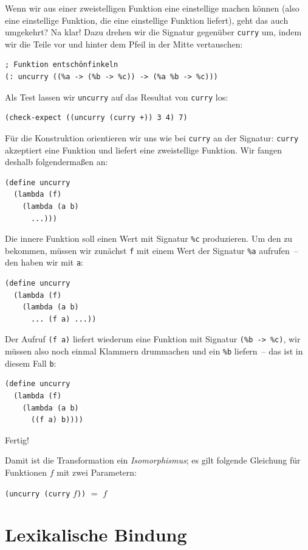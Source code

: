 Wenn wir aus einer zweistelligen Funktion eine einstellige machen
können (also eine einstellige Funktion, die eine einstellige Funktion
liefert), geht das auch umgekehrt?  Na klar!  Dazu drehen wir die
Signatur gegenüber \lstinline{curry} um, indem wir die Teile vor und
hinter dem Pfeil in der Mitte vertauschen:
%
\begin{lstlisting}
; Funktion entschönfinkeln
(: uncurry ((%a -> (%b -> %c)) -> (%a %b -> %c)))
\end{lstlisting}
%
Als Test lassen wir \lstinline{uncurry} auf das Resultat von
\lstinline{curry} los:
\begin{lstlisting}
(check-expect ((uncurry (curry +)) 3 4) 7)
\end{lstlisting}
%
Für die Konstruktion orientieren wir uns wie bei \lstinline{curry} an
der Signatur: \lstinline{curry} akzeptiert eine Funktion und liefert
eine zweistellige Funktion.  Wir fangen deshalb folgendermaßen an:
%
\begin{lstlisting}
(define uncurry
  (lambda (f)
    (lambda (a b)
      ...)))
\end{lstlisting}
%
Die innere Funktion soll einen Wert mit Signatur \lstinline{%c}
produzieren.  Um den zu bekommen, müssen wir zunächst \lstinline{f}
mit einem Wert der Signatur \lstinline{%a} aufrufen~-- den haben wir
mit \lstinline{a}:
%
\begin{lstlisting}
(define uncurry
  (lambda (f)
    (lambda (a b)
      ... (f a) ...))
\end{lstlisting}
%
Der Aufruf \lstinline{(f a)} liefert wiederum eine Funktion mit
Signatur \lstinline{(%b -> %c)}, wir müssen also noch einmal Klammern
drummachen und ein \lstinline{%b} liefern~-- das ist in diesem Fall
\lstinline{b}:
%
\begin{lstlisting}
(define uncurry
  (lambda (f)
    (lambda (a b)
      ((f a) b))))
\end{lstlisting}
%
Fertig!

Damit ist die Transformation ein \textit{Isomorphismus}; es gilt
folgende Gleichung für Funktionen $f$ mit zwei Parametern:
%
\begin{center}
  \lstinline{(uncurry (curry} \(f\)\lstinline{))} \(=\) \(f\)
\end{center}

\section{Lexikalische Bindung}
\label{sec:lexikalische-bindung}

